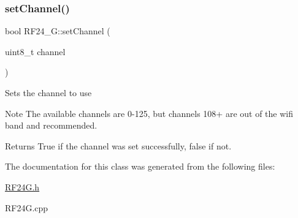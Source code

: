 \subsubsection{\texorpdfstring{set\+Channel()}{setChannel()}}
{\footnotesize\ttfamily bool R\+F24\+\_\+\+G\+::set\+Channel (\begin{DoxyParamCaption}\item[{uint8\+\_\+t}]{channel }\end{DoxyParamCaption})}

Sets the channel to use \begin{DoxyNote}{Note}
The available channels are 0-\/125, but channels 108+ are out of the wifi band and recommended.
\end{DoxyNote}
\begin{DoxyReturn}{Returns}
True if the channel was set successfully, false if not. 
\end{DoxyReturn}


The documentation for this class was generated from the following files\+:\begin{DoxyCompactItemize}
\item 
\hyperlink{_r_f24_g_8h}{R\+F24\+G.\+h}\item 
R\+F24\+G.\+cpp\end{DoxyCompactItemize}
